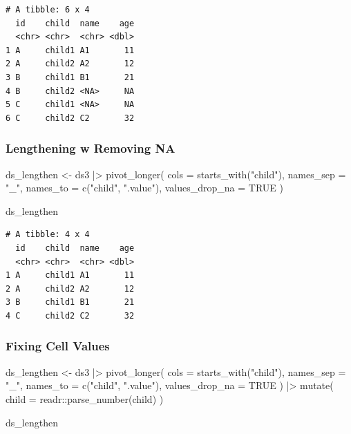 \documentclass[
  letterpaper,
  DIV=11,
  numbers=noendperiod]{scrreprt}
\newenvironment{Shaded}{\begin{snugshade}}{\end{snugshade}}
\newcommand{\AttributeTok}[1]{\textcolor[rgb]{0.40,0.45,0.13}{#1}}
\newcommand{\ConstantTok}[1]{\textcolor[rgb]{0.56,0.35,0.01}{#1}}
\newcommand{\FunctionTok}[1]{\textcolor[rgb]{0.28,0.35,0.67}{#1}}
\newcommand{\NormalTok}[1]{\textcolor[rgb]{0.00,0.23,0.31}{#1}}
\newcommand{\OtherTok}[1]{\textcolor[rgb]{0.00,0.23,0.31}{#1}}
\newcommand{\SpecialCharTok}[1]{\textcolor[rgb]{0.37,0.37,0.37}{#1}}
\newcommand{\StringTok}[1]{\textcolor[rgb]{0.13,0.47,0.30}{#1}}
\begin{document}
\begin{verbatim}
# A tibble: 6 x 4
  id    child  name    age
  <chr> <chr>  <chr> <dbl>
1 A     child1 A1       11
2 A     child2 A2       12
3 B     child1 B1       21
4 B     child2 <NA>     NA
5 C     child1 <NA>     NA
6 C     child2 C2       32
\end{verbatim}

\subsubsection{Lengthening w Removing
NA}\label{lengthening-w-removing-na}

\begin{Shaded}
\begin{Highlighting}[]
\NormalTok{ds\_lengthen }\OtherTok{\textless{}{-}}\NormalTok{ ds3 }\SpecialCharTok{|\textgreater{}} 
  \FunctionTok{pivot\_longer}\NormalTok{(}
    \AttributeTok{cols =} \FunctionTok{starts\_with}\NormalTok{(}\StringTok{"child"}\NormalTok{),}
    \AttributeTok{names\_sep =} \StringTok{"\_"}\NormalTok{,}
    \AttributeTok{names\_to =} \FunctionTok{c}\NormalTok{(}\StringTok{"child"}\NormalTok{, }\StringTok{".value"}\NormalTok{),}
    \AttributeTok{values\_drop\_na =} \ConstantTok{TRUE}
\NormalTok{  )}

\NormalTok{ds\_lengthen}
\end{Highlighting}
\end{Shaded}

\begin{verbatim}
# A tibble: 4 x 4
  id    child  name    age
  <chr> <chr>  <chr> <dbl>
1 A     child1 A1       11
2 A     child2 A2       12
3 B     child1 B1       21
4 C     child2 C2       32
\end{verbatim}

\subsubsection{Fixing Cell Values}\label{fixing-cell-values}

\begin{Shaded}
\begin{Highlighting}[]
\NormalTok{ds\_lengthen }\OtherTok{\textless{}{-}}\NormalTok{ ds3 }\SpecialCharTok{|\textgreater{}} 
  \FunctionTok{pivot\_longer}\NormalTok{(}
    \AttributeTok{cols =} \FunctionTok{starts\_with}\NormalTok{(}\StringTok{"child"}\NormalTok{),}
    \AttributeTok{names\_sep =} \StringTok{"\_"}\NormalTok{,}
    \AttributeTok{names\_to =} \FunctionTok{c}\NormalTok{(}\StringTok{"child"}\NormalTok{, }\StringTok{".value"}\NormalTok{),}
    \AttributeTok{values\_drop\_na =} \ConstantTok{TRUE}
\NormalTok{  ) }\SpecialCharTok{|\textgreater{}} 
  \FunctionTok{mutate}\NormalTok{(}
    \AttributeTok{child =}\NormalTok{ readr}\SpecialCharTok{::}\FunctionTok{parse\_number}\NormalTok{(child)}
\NormalTok{  )}

\NormalTok{ds\_lengthen}
\end{Highlighting}
\end{Shaded}
\end{document}

